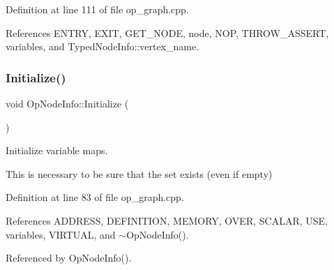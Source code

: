 Definition at line 111 of file op\+\_\+graph.\+cpp.



References E\+N\+T\+RY, E\+X\+IT, G\+E\+T\+\_\+\+N\+O\+DE, node, N\+OP, T\+H\+R\+O\+W\+\_\+\+A\+S\+S\+E\+RT, variables, and Typed\+Node\+Info\+::vertex\+\_\+name.

\mbox{\label{structOpNodeInfo_a0ce82bb59facad4a65403621b9fe88c6}} 
\subsubsection{\texorpdfstring{Initialize()}{Initialize()}}
{\footnotesize\ttfamily void Op\+Node\+Info\+::\+Initialize (\begin{DoxyParamCaption}{ }\end{DoxyParamCaption})}



Initialize variable maps. 

This is necessary to be sure that the set exists (even if empty) 

Definition at line 83 of file op\+\_\+graph.\+cpp.



References A\+D\+D\+R\+E\+SS, D\+E\+F\+I\+N\+I\+T\+I\+ON, M\+E\+M\+O\+RY, O\+V\+ER, S\+C\+A\+L\+AR, U\+SE, variables, V\+I\+R\+T\+U\+AL, and $\sim$\+Op\+Node\+Info().



Referenced by Op\+Node\+Info().


